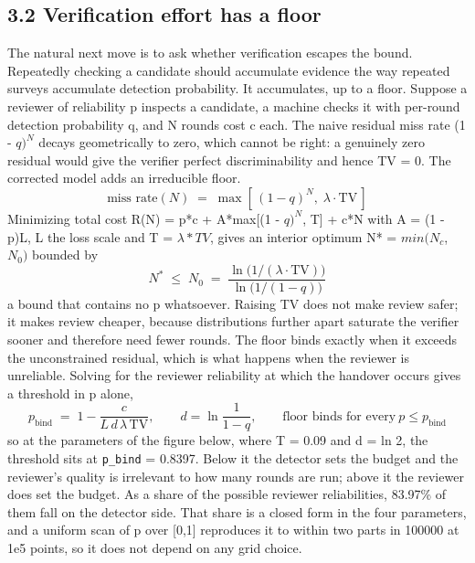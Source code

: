 \documentclass[11pt,a4paper]{article}
\theoremstyle{definition}
\theoremstyle{remark}
\begin{document}
\subsection*{3.2  Verification effort has a floor}
The natural next move is to ask whether verification escapes the bound. Repeatedly checking a candidate should accumulate evidence the way repeated surveys accumulate detection probability. It accumulates, up to a floor.
Suppose a reviewer of reliability p inspects a candidate, a machine checks it with per-round detection probability q, and N rounds cost c each. The naive residual miss rate (1 - $q)^N$ decays geometrically to zero, which cannot be right: a genuinely zero residual would give the verifier perfect discriminability and hence TV = 0. The corrected model adds an irreducible floor.
\begin{equation}
\text{miss rate}(N)\;=\;\max\!\left[\,(1-q)^{N},\;\lambda\cdot\mathrm{TV}\,\right]
\tag{6}
\end{equation}
Minimizing total cost R(N) = p*c + A*max[(1 - $q)^N$, T] + c*N with A = (1 - p)L, L the loss scale and T = $λ*TV$, gives an interior optimum N* = $min(N_c$, $N_0)$ bounded by
\begin{equation}
N^{*}\;\leq\;N_0\;=\;\frac{\ln\!\big(1/(\lambda\cdot\mathrm{TV})\big)}{\ln\!\big(1/(1-q)\big)}
\tag{7}
\end{equation}
a bound that contains no p whatsoever. Raising TV does not make review safer; it makes review cheaper, because distributions further apart saturate the verifier sooner and therefore need fewer rounds.
The floor binds exactly when it exceeds the unconstrained residual, which is what happens when the reviewer is unreliable. Solving for the reviewer reliability at which the handover occurs gives a threshold in p alone,
\begin{equation}
p_{\mathrm{bind}}\;=\;1-\frac{c}{L\,d\,\lambda\,\mathrm{TV}},\qquad d=\ln\frac{1}{1-q},\qquad\text{floor binds for every}\ p\leq p_{\mathrm{bind}}
\tag{8}
\end{equation}
so at the parameters of the figure below, where T = 0.09 and d = ln 2, the threshold sits at \texttt{p\_\allowbreak{}bind} = 0.8397. Below it the detector sets the budget and the reviewer's quality is irrelevant to how many rounds are run; above it the reviewer does set the budget. As a share of the possible reviewer reliabilities, 83.97\% of them fall on the detector side. That share is a closed form in the four parameters, and a uniform scan of p over [0,1] reproduces it to within two parts in 100000 at 1e5 points, so it does not depend on any grid choice.
\end{document}
